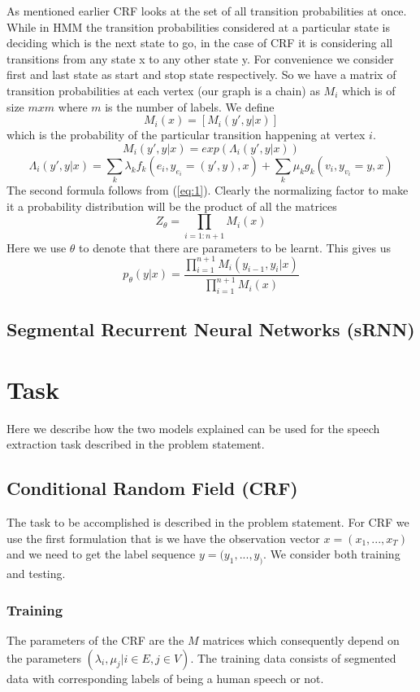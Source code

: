\documentclass[letterpaper]{article} %
\begin{document}
As mentioned earlier CRF looks at the set of all transition probabilities at once. While in HMM the transition probabilities considered at a particular state is deciding which is the next state to go, in the case of CRF it is considering all transitions from any state x to any other state y. For convenience we consider first and last state as start and stop state respectively. So we have a matrix of transition probabilities at each vertex (our graph is a chain) as $M_i$ which is of size $m x m$ where $m$ is the number of labels. We define $$M_i(x) = [M_i(y', y| x)]$$ which is the probability of the particular transition happening at vertex $i$. $$M_i(y', y| x) = exp(\Lambda_i(y', y|x))$$ $$\Lambda_i(y', y| x) = \sum_k\lambda_kf_k(e_i, y_{e_i}{=}(y', y), x) + \sum_k \mu_k g_k(v_i, y_{v_i}{=}y, x)$$ The second formula follows from (\ref{eq:1}). Clearly the normalizing factor to make it a probability distribution will be the product of all the matrices $$Z_{\theta} = \prod_{i=1:n+1}M_i(x)$$ Here we use $\theta$ to denote that there are parameters to be learnt. This gives us $$p_{\theta}(y|x) = \frac{\prod_{i=1}^{n+1}M_i(y_{i-1}, y_{i}|x)}{\prod_{i=1}^{n+1}M_i(x)}$$



\subsection{Segmental Recurrent Neural Networks (sRNN)}


\section{Task}
Here we describe how the two models explained can be used for the speech extraction task described in the problem statement.
\subsection{Conditional Random Field (CRF)}
The task to be accomplished is described in the problem statement. For CRF we use the first formulation that is we have the observation vector $x = (x_1, ..., x_T)$ and we need to get the label sequence $y = (y_1, ... , y_)$. We consider both training and testing.

\subsubsection{Training}The parameters of the CRF are the $M$ matrices which consequently depend on the parameters $(\lambda_i, \mu_j| i \in E, j \in V)$. The training data consists of segmented data with corresponding labels of being a human speech or not.
\end{document}
